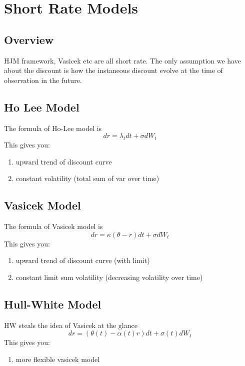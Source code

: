 \newpage
\section{Short Rate Models}
\subsection{Overview}
HJM framework, Vasicek etc are all short rate. The only assumption we have about the discount is how the instaneous discount evolve at the time of observation in the future.

\subsection{Ho Lee Model}
The formula of Ho-Lee model is
\begin{equation}
dr = \lambda_t dt + \sigma dW_t
\end{equation}
This gives you:
\begin{enumerate}
\item upward trend of discount curve
\item constant volatility (total sum of var over time)
\end{enumerate}


\subsection{Vasicek Model}
The formula of Vasicek model is
\begin{equation}
dr = \kappa (\theta - r) dt + \sigma dW_t
\end{equation}
This gives you:
\begin{enumerate}
\item upward trend of discount curve (with limit)
\item constant limit {\color{red}sum} volatility (decreasing volatility over time)
\end{enumerate}



\subsection{Hull-White Model}
HW steals the idea of Vasicek at the glance
\begin{equation}
dr = (\theta(t) - \alpha(t)r) dt + \sigma(t) dW_t
\end{equation}
This gives you:
\begin{enumerate}
\item more flexible vasicek model
\end{enumerate}

